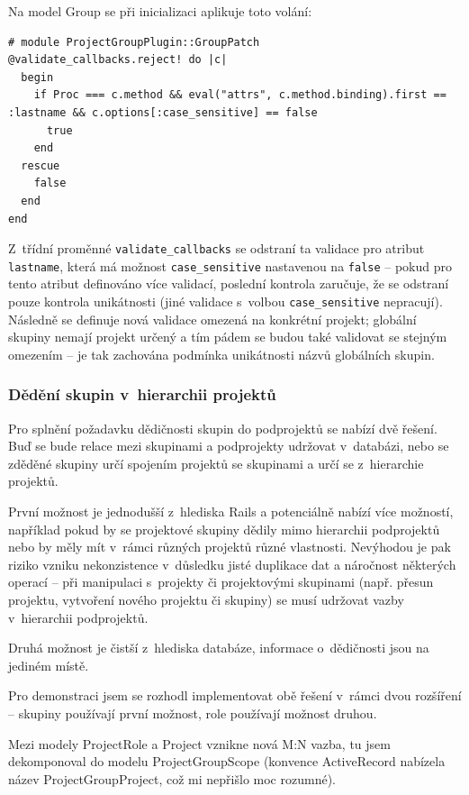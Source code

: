 \documentclass[thesis=B,czech]{FITthesis}[2012/05/02]
\begin{document}
Na model Group se při inicializaci aplikuje toto volání:

\begin{lstlisting}
# module ProjectGroupPlugin::GroupPatch
@validate_callbacks.reject! do |c|
  begin
    if Proc === c.method && eval("attrs", c.method.binding).first == :lastname && c.options[:case_sensitive] == false
      true
    end
  rescue
    false
  end
end
\end{lstlisting}
Z~třídní proměnné \lstinline!validate_callbacks! se odstraní ta validace
pro atribut \lstinline!lastname!, která má možnost
\lstinline!case_sensitive! nastavenou na \lstinline!false! -- pokud pro
tento atribut definováno více validací, poslední kontrola zaručuje, že
se odstraní pouze kontrola unikátnosti (jiné validace s~volbou
\lstinline!case_sensitive! nepracují). Následně se definuje nová
validace omezená na konkrétní projekt; globální skupiny nemají projekt
určený a tím pádem se budou také validovat se stejným omezením -- je tak
zachována podmínka unikátnosti názvů globálních skupin.

\subsubsection{Dědění skupin v~hierarchii projektů}
\label{sec:proj_group_inherit}

Pro splnění požadavku dědičnosti skupin do podprojektů se nabízí dvě
řešení. Buď se bude relace mezi skupinami a podprojekty udržovat
v~databázi, nebo se zděděné skupiny určí spojením projektů se skupinami a
určí se z~hierarchie projektů.

První možnost je jednodušší z~hlediska Rails a potenciálně nabízí více
možností, například pokud by se projektové skupiny dědily mimo
hierarchii podprojektů nebo by měly mít v~rámci různých projektů různé
vlastnosti. Nevýhodou je pak riziko vzniku nekonzistence v~důsledku
jisté duplikace dat a náročnost některých operací -- při manipulaci
s~projekty či projektovými skupinami (např. přesun projektu, vytvoření
nového projektu či skupiny) se musí udržovat vazby v~hierarchii
podprojektů.

Druhá možnost je čistší z~hlediska databáze, informace o~dědičnosti jsou
na jediném místě.

Pro demonstraci jsem se rozhodl implementovat obě řešení v~rámci dvou
rozšíření -- skupiny používají první možnost, role používají možnost
druhou.

Mezi modely ProjectRole a Project vznikne nová M:N vazba, tu jsem
dekomponoval do modelu ProjectGroupScope (konvence ActiveRecord nabízela
název ProjectGroupProject, což mi nepřišlo moc rozumné).
\end{document}
